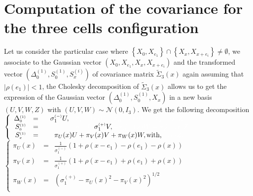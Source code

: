 \documentclass[12pt]{article}
\renewcommand{\tilde}{\widetilde}
\theoremstyle{Theorem}
\theoremstyle{definition}
\begin{document}
\section{Computation of the covariance for the three cells configuration}
Let us consider the particular case where $\left\{ X_{0}, X_{e_1}\right\} \cap \left\{ X_{x}, X_{x+e_i}\right\} \neq \emptyset $,
 we associate to the Gaussian vector $\left(X_{0}, X_{e_1}, X_{x}, X_{x+e_i} \right)$ and the transformed vector $\left(\Delta^{\scriptscriptstyle (1)}_{\scriptscriptstyle 0}, S^{\scriptscriptstyle (1)}_{\scriptscriptstyle 0}, S^{\scriptscriptstyle (i)}_{x} \right)$ of covariance matrix $\tilde{\Sigma}_{3}(x)$ again assuming that $|\rho(e_1)| < 1$, the Cholesky decomposition of $\tilde{\Sigma}_{3}(x)$ allows us to get the expression of the Gaussian vector $\left(\Delta^{\scriptscriptstyle (1)}_{\scriptscriptstyle 0},S^{\scriptscriptstyle (1)}_{\scriptscriptstyle 0},X_{x} \right)$ in a new basis $\left(U,V,W,Z\right)$ with $\left(U, V, W\right) \sim \mathcal{N}\left(0,I_{3}\right)$. We get the following decomposition \\ 
$\left\{
\begin{array}{rlc}
\Delta^{\scriptscriptstyle (1)}_{\scriptscriptstyle 0} & = & \sigma^{\scriptscriptstyle (-)}_{1}U,  \textcolor{white}{+  \pi^{\scriptscriptstyle(+, i)}_{V}(x) V +  \pi^{\scriptscriptstyle(+, i)}_{W}(x) W +  \pi^{\scriptscriptstyle(+, i)}_{Z}(x)Z, } \\
S^{\scriptscriptstyle (1)}_{\scriptscriptstyle 0} & = & \hspace{1.55cm} \textcolor{white}{\sigma^{\scriptscriptstyle (-)}_{1}U,} \sigma^{\scriptscriptstyle (+)}_{1}V, \textcolor{white}{+  \pi^{\scriptscriptstyle(+, i)}_{W}(x) W +  \pi^{\scriptscriptstyle(+, i)}_{Z}(x)Z, } \\
S^{\scriptscriptstyle (1)}_{\scriptscriptstyle  x} & = &  \hspace{-1cm} \pi_{U}(x)U +  \pi_{V}(x) V +  \pi_{W}(x) W, \textcolor{white}{ + \pi^{\scriptscriptstyle(+, i)}_{Z}(x)Z, } \text{\hspace{-2cm} with,} \\
\end{array}\right.$\\ 
$\left\{
\begin{array}{rlc}
 \pi_{U}(x) & = & \frac{1}{\sigma^{\scriptscriptstyle (-)}_{1}}\left(1 + \rho(x-e_1) - \rho(e_1) - \rho(x)\right) \\
\pi_{V}(x) & = & \frac{1}{\sigma^{\scriptscriptstyle (+)}_{1}}\left(1 + \rho(x-e_1) + \rho(e_1) + \rho(x)\right) \\
\pi_{W}(x) & = & \left(\sigma^{\scriptscriptstyle (+)}_{1} - \pi_{U}(x)^{2} - \pi_{V}(x)^{2} \right)^{1/2} \\
\end{array}\right.$ \\
\end{document}
